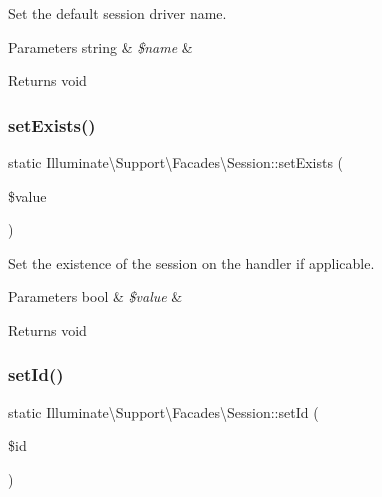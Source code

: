 Set the default session driver name.


\begin{DoxyParams}[1]{Parameters}
string & {\em \$name} & \\
\hline
\end{DoxyParams}
\begin{DoxyReturn}{Returns}
void 
\end{DoxyReturn}
\mbox{\label{class_illuminate_1_1_support_1_1_facades_1_1_session_a440918b19ecd6455272268fc9d7d2793}} 
\subsubsection{\texorpdfstring{set\+Exists()}{setExists()}}
{\footnotesize\ttfamily static Illuminate\textbackslash{}\+Support\textbackslash{}\+Facades\textbackslash{}\+Session\+::set\+Exists (\begin{DoxyParamCaption}\item[{}]{\$value }\end{DoxyParamCaption})\hspace{0.3cm}{\ttfamily [static]}}

Set the existence of the session on the handler if applicable.


\begin{DoxyParams}[1]{Parameters}
bool & {\em \$value} & \\
\hline
\end{DoxyParams}
\begin{DoxyReturn}{Returns}
void 
\end{DoxyReturn}
\mbox{\label{class_illuminate_1_1_support_1_1_facades_1_1_session_af75e2503069c77ffd548d8f3d5c952d7}} 
\subsubsection{\texorpdfstring{set\+Id()}{setId()}}
{\footnotesize\ttfamily static Illuminate\textbackslash{}\+Support\textbackslash{}\+Facades\textbackslash{}\+Session\+::set\+Id (\begin{DoxyParamCaption}\item[{}]{\$id }\end{DoxyParamCaption})\hspace{0.3cm}{\ttfamily [static]}}

